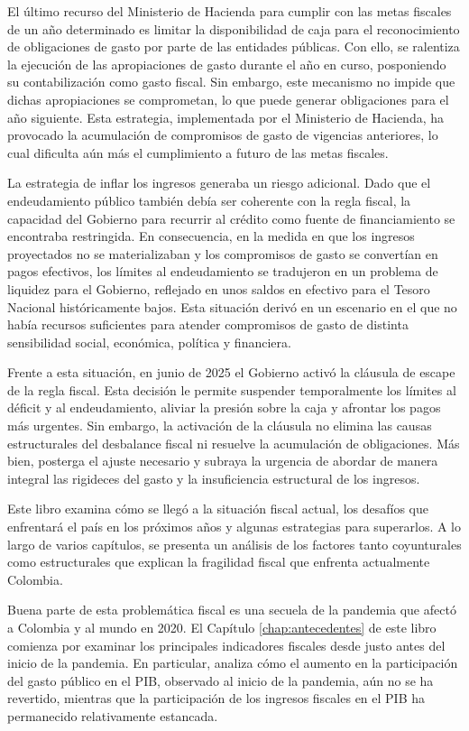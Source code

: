 \begin{introduction}
El último recurso del Ministerio de Hacienda para cumplir con las metas fiscales de un año determinado es limitar la disponibilidad de caja para el reconocimiento de obligaciones de gasto por parte de las entidades públicas. Con ello, se ralentiza la ejecución de las apropiaciones de gasto durante el año en curso, posponiendo su contabilización como gasto fiscal. Sin embargo, este mecanismo no impide que dichas apropiaciones se comprometan, lo que puede generar obligaciones para el año siguiente. Esta estrategia, implementada por el Ministerio de Hacienda, ha provocado la acumulación de compromisos de gasto de vigencias anteriores, lo cual dificulta aún más el cumplimiento a futuro de las metas fiscales.

La estrategia de inflar los ingresos generaba un riesgo adicional. Dado que el endeudamiento público también debía ser coherente con la regla fiscal, la capacidad del Gobierno para recurrir al crédito como fuente de financiamiento se encontraba restringida. En consecuencia, en la medida en que los ingresos proyectados no se materializaban y los compromisos de gasto se convertían en pagos efectivos, los límites al endeudamiento se tradujeron en un problema de liquidez para el Gobierno, reflejado en unos saldos en efectivo para el Tesoro Nacional históricamente bajos. Esta situación derivó en un escenario en el que no había recursos suficientes para atender compromisos de gasto de distinta sensibilidad social, económica, política y financiera.

Frente a esta situación, en junio de 2025 el Gobierno activó la cláusula de escape de la regla fiscal. Esta decisión le permite suspender temporalmente los límites al déficit y al endeudamiento, aliviar la presión sobre la caja y afrontar los pagos más urgentes. Sin embargo, la activación de la cláusula no elimina las causas estructurales del desbalance fiscal ni resuelve la acumulación de obligaciones. Más bien, posterga el ajuste necesario y subraya la urgencia de abordar de manera integral las rigideces del gasto y la insuficiencia estructural de los ingresos.

Este libro examina cómo se llegó a la situación fiscal actual, los desafíos que enfrentará el país en los próximos años y algunas estrategias para superarlos. A lo largo de varios capítulos, se presenta un análisis de los factores tanto coyunturales como estructurales que explican la fragilidad fiscal que enfrenta actualmente Colombia.

Buena parte de esta problemática fiscal es una secuela de la pandemia que afectó a Colombia y al mundo en 2020. El Capítulo \ref{chap:antecedentes} de este libro comienza por examinar los principales indicadores fiscales desde justo antes del inicio de la pandemia. En particular, analiza cómo el aumento en la participación del gasto público en el PIB, observado al inicio de la pandemia, aún no se ha revertido, mientras que la participación de los ingresos fiscales en el PIB ha permanecido relativamente estancada.


\end{introduction}
